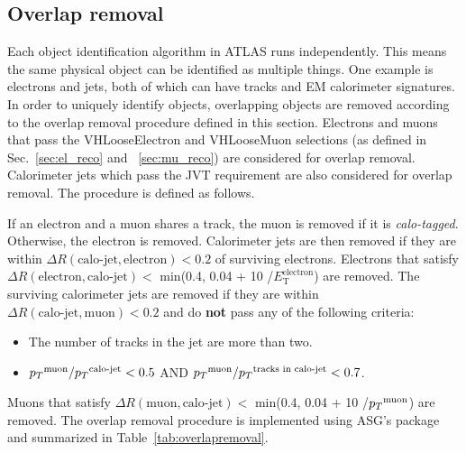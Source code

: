 \subsection{Overlap removal}
\label{sec:overlapremoval}
Each object identification algorithm in ATLAS runs independently. This means the same physical object can be identified as multiple things. One example is electrons and jets, both of which can have tracks and EM calorimeter signatures. In order to uniquely identify objects, overlapping objects are removed according to the overlap removal procedure defined in this section. 
Electrons and muons that pass the VHLooseElectron and VHLooseMuon selections (as defined in Sec.~\ref{sec:el_reco} and ~\ref{sec:mu_reco}) are considered for overlap removal. 
Calorimeter jets which pass the JVT requirement are also considered for overlap removal. The procedure is defined as follows.

If an electron and a muon shares a track, the muon is removed if it is \textit{calo-tagged}. Otherwise, the electron is removed.
Calorimeter jets are then removed if they are within $\Delta R(\text{calo-jet}, \text{electron}) < 0.2$ of surviving electrons. 
Electrons that satisfy $\Delta R(\text{electron},\text{calo-jet}) <$ min(0.4, 0.04 + 10 \GeV /$E^\text{electron}_\text{T}$) are removed. 
The surviving calorimeter jets are removed if they are within $\Delta R(\text{calo-jet}, \text{muon}) < 0.2$ and 
do \textbf{not} pass any of the following criteria:

\begin{itemize}
\item The number of tracks in the jet are more than two.
\item $\pt^{\text{muon}} / \pt^{\text{calo-jet}} < 0.5$  AND  $\pt^{\text{muon}} / \pt^{\text{tracks in calo-jet}} < 0.7$.
\end{itemize}

Muons that satisfy $\Delta R(\text{muon},\text{calo-jet}) <$ min(0.4, 0.04 + 10 \GeV /$\pt^\text{muon}$) are removed. 
The overlap removal procedure is implemented using ASG's 
package and summarized in Table~\ref{tab:overlapremoval}.

